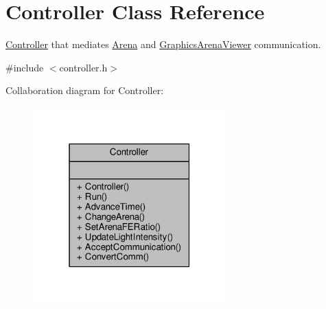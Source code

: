 \hypertarget{classController}{}\section{Controller Class Reference}
\label{classController}


\hyperlink{classController}{Controller} that mediates \hyperlink{classArena}{Arena} and \hyperlink{classGraphicsArenaViewer}{Graphics\+Arena\+Viewer} communication.  




{\ttfamily \#include $<$controller.\+h$>$}



Collaboration diagram for Controller\+:\nopagebreak
\begin{figure}[H]
\begin{center}
\leavevmode
\includegraphics[width=211pt]{classController__coll__graph}
\end{center}
\end{figure}
